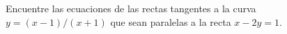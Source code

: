 \setcounter{enumi}{41}
\item Encuentre las ecuaciones de las rectas tangentes a la curva $y = (x - 1)/(x + 1)$ que sean paralelas a la recta $x - 2y = 1$.
